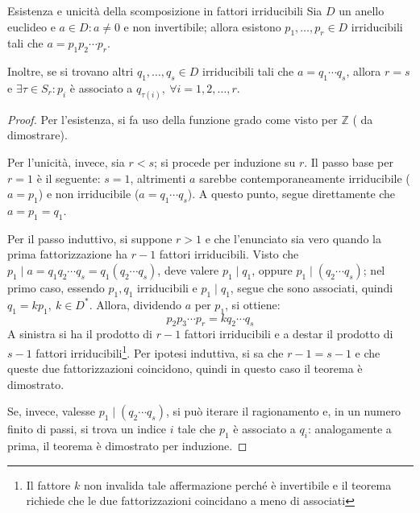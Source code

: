 \documentclass[11pt, a4paper]{scrartcl}
\theoremstyle{definition}
\numberwithin{esempio}{section}
\theoremstyle{definition}
\numberwithin{obs}{section}
\numberwithin{nota}{section}
\numberwithin{equation}{subsection}
\begin{document}
\begin{teorema}
	{Esistenza e unicit\`a della scomposizione in fattori irriducibili}{}
	Sia $D$ un anello euclideo e $a \in D : a\neq 0	$ e non invertibile; allora esistono $p_1,\ldots,p_r \in D$ irriducibili tali che $a = p_1p_2\cdots p_r$.

	Inoltre, se si trovano altri $q_1,\ldots,q_s \in D$ irriducibili tali che $a = q_1\cdots q_s$, allora $ r=s $ e $\exists  \tau  \in S_r : p_i$ \`e associato a $q_{\tau (i)} , \ \forall  i= 1,2,\ldots,r$.
	\begin{proof}
		Per l'esistenza, si fa uso della funzione grado come visto per $\mathbb{Z}$ ({\color{red} da dimostrare}).

		Per l'unicit\`a, invece, sia $r<s$; si procede per induzione su $r$.
		Il passo base per $r=1$ \`e il seguente: $s=1$, altrimenti $a$ sarebbe contemporaneamente irriducibile ($a=p_1$) e non irriducibile ($a = q_1\cdots q_s$).
		A questo punto, segue direttamente che $a = p_1 = q_1$.

		Per il passo induttivo, si suppone $r>1$ e che l'enunciato sia vero quando la prima fattorizzazione ha $r-1$ fattori irriducibili.
Visto che $p_1  \mid a = q_1q_2 \cdots q_s = q_1(q_2 \cdots q_s)$, deve valere $p_1  \mid q_1$, oppure $p_1  \mid (q_2 \cdots q_s)$; nel primo caso, essendo $p_1,q_1$ irriducibili e $p_1  \mid  q_1$, segue che sono associati, quindi $q_1 = kp_1, \ k \in D^*$.
Allora, dividendo $a$ per $p_1$, si ottiene:
\[
p_2p_3 \cdots p_r = k q_2 \cdots q_s
\] 
A sinistra si ha il prodotto di $r-1$ fattori irriducibili e a destar il prodotto di $s-1$ fattori irriducibili\footnote{Il fattore $k$ non invalida tale affermazione perch\'e \`e invertibile e il teorema richiede che le due fattorizzazioni coincidano a meno di associati}. Per ipotesi induttiva, si sa che $r-1 = s-1$ e che queste due fattorizzazioni coincidono, quindi in questo caso il teorema \`e dimostrato. 

Se, invece, valesse $p_1  \mid  (q_2 \cdots q_s)$, si pu\`o iterare il ragionamento e, in un numero finito di passi, si trova un indice $i$ tale che $p_1$ \`e associato a $q_i$: analogamente a prima, il teorema \`e dimostrato per induzione.
	\end{proof}
\end{teorema}
\end{document}
